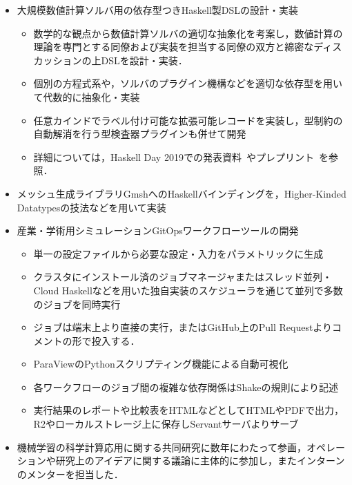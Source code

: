 \documentclass[a4j,draft]{ltjsarticle}
\begin{document}
\begin{refsection}
\begin{itemize}
  \item 大規模数値計算ソルバ用の依存型つきHaskell製DSLの設計・実装
  \begin{itemize}
    \item 数学的な観点から数値計算ソルバの適切な抽象化を考案し，数値計算の理論を専門とする同僚および実装を担当する同僚の双方と綿密なディスカッションの上DSLを設計・実装．
    \item 個別の方程式系や，ソルバのプラグイン機構などを適切な依存型を用いて代数的に抽象化・実装
    \item 任意カインドでラベル付け可能な拡張可能レコードを実装し，型制約の自動解消を行う型検査器プラグインも併せて開発
    \item 詳細については，Haskell Day 2019での発表資料~\cite{ISHII:2019hd-ja}やプレプリント~\cite{ISHII:2021wt}を参照．
  \end{itemize}
  \item メッシュ生成ライブラリGmshへのHaskellバインディングを，Higher-Kinded Datatypesの技法などを用いて実装
  \item 産業・学術用シミュレーションGitOpsワークフローツールの開発
    \begin{itemize}
    \item 単一の設定ファイルから必要な設定・入力をパラメトリックに生成
    \item クラスタにインストール済のジョブマネージャまたはスレッド並列・Cloud Haskellなどを用いた独自実装のスケジューラを通じて並列で多数のジョブを同時実行
    \item ジョブは端末上より直接の実行，またはGitHub上のPull Requestよりコメントの形で投入する．
    \item ParaViewのPythonスクリプティング機能による自動可視化
    \item 各ワークフローのジョブ間の複雑な依存関係はShakeの規則により記述
    \item 実行結果のレポートや比較表をHTMLなどとしてHTMLやPDFで出力，R2やローカルストレージ上に保存しServantサーバよりサーブ
    \end{itemize}
  \item 機械学習の科学計算応用に関する共同研究に数年にわたって参画，オペレーションや研究上のアイデアに関する議論に主体的に参加し，またインターンのメンターを担当した．
\end{itemize}

\printbibliography[title={職歴欄参考文献},heading=subbibliography]

\end{refsection}
\end{document}
